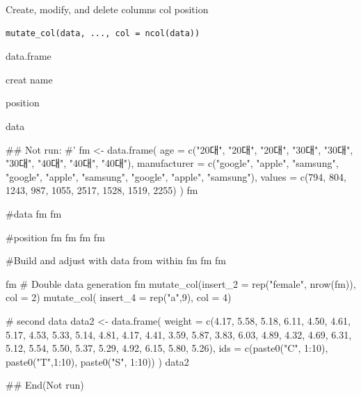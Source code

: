 \documentclass[a4paper]{book}
\begin{document}
%
\begin{Description}
Create, modify, and delete columns col position
\end{Description}
%
\begin{Usage}
\begin{verbatim}
mutate_col(data, ..., col = ncol(data))
\end{verbatim}
\end{Usage}
%
\begin{Arguments}
\begin{ldescription}
\item[\code{data}] data.frame

\item[\code{...}] creat name

\item[\code{col}] position
\end{ldescription}
\end{Arguments}
%
\begin{Value}
data
\end{Value}
%
\begin{Examples}
\begin{ExampleCode}

\#\# Not run: 
#'
fm <- data.frame(
  age = c("20대", "20대", "20대", "30대",
  "30대", "30대", "40대", "40대", "40대"),
  manufacturer = c("google", "apple", "samsung",
  "google", "apple", "samsung", "google",
   "apple", "samsung"),
  values = c(794, 804, 1243, 987, 1055,
  2517, 1528, 1519, 2255)
)
fm

#data
fm %
fm %

#position
fm %
fm %
fm %
fm %

#Build and adjust with data from within
fm %
fm %
fm %

fm %
# Double data generation
fm %
  mutate_col(insert_2 = rep("female", nrow(fm)), col = 2) %
  mutate_col( insert_4 = rep("a",9), col = 4)


# second data
data2 <- data.frame(
  weight = c(4.17, 5.58, 5.18, 6.11, 4.50, 4.61, 5.17, 4.53, 5.33, 5.14,
             4.81, 4.17, 4.41, 3.59, 5.87, 3.83, 6.03, 4.89, 4.32, 4.69,
             6.31, 5.12, 5.54, 5.50, 5.37, 5.29, 4.92, 6.15, 5.80, 5.26),
  ids = c(paste0("C", 1:10), paste0("T",1:10), paste0("S", 1:10))
)
data2 %


## End(Not run)

\end{ExampleCode}
\end{Examples}
\end{document}
